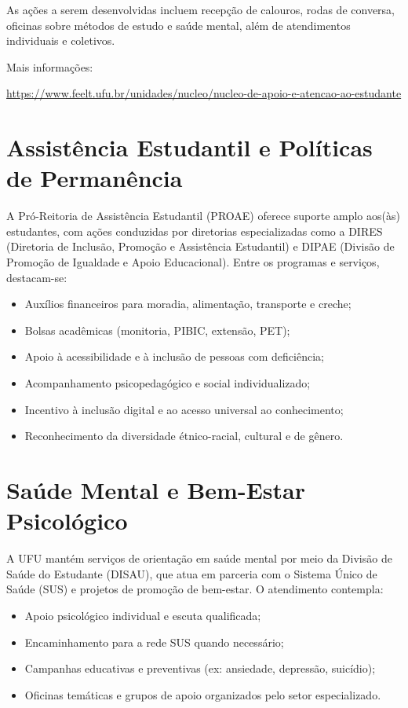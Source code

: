 As ações a serem desenvolvidas incluem recepção de calouros, rodas de conversa, oficinas sobre métodos de estudo e saúde mental, além de atendimentos individuais e coletivos.

Mais informações:

{\footnotesize\url{https://www.feelt.ufu.br/unidades/nucleo/nucleo-de-apoio-e-atencao-ao-estudante}}

\section{Assistência Estudantil e Políticas de Permanência}

A Pró-Reitoria de Assistência Estudantil (PROAE) oferece suporte amplo aos(às) estudantes, com ações conduzidas por diretorias especializadas como a DIRES (Diretoria de Inclusão, Promoção e Assistência Estudantil) e DIPAE (Divisão de Promoção de Igualdade e Apoio Educacional). Entre os programas e serviços, destacam-se:

\begin{itemize}
\item Auxílios financeiros para moradia, alimentação, transporte e creche;
\item Bolsas acadêmicas (monitoria, PIBIC, extensão, PET);
\item Apoio à acessibilidade e à inclusão de pessoas com deficiência;
\item Acompanhamento psicopedagógico e social individualizado;
\item Incentivo à inclusão digital e ao acesso universal ao conhecimento;
\item Reconhecimento da diversidade étnico-racial, cultural e de gênero.
\end{itemize}

\section{Saúde Mental e Bem-Estar Psicológico}

A UFU mantém serviços de orientação em saúde mental por meio da Divisão de Saúde do Estudante (DISAU), que atua em parceria com o Sistema Único de Saúde (SUS) e projetos de promoção de bem-estar. O atendimento contempla:

\begin{itemize}
\item Apoio psicológico individual e escuta qualificada;
\item Encaminhamento para a rede SUS quando necessário;
\item Campanhas educativas e preventivas (ex: ansiedade, depressão, suicídio);
\item Oficinas temáticas e grupos de apoio organizados pelo setor especializado.
\end{itemize}

